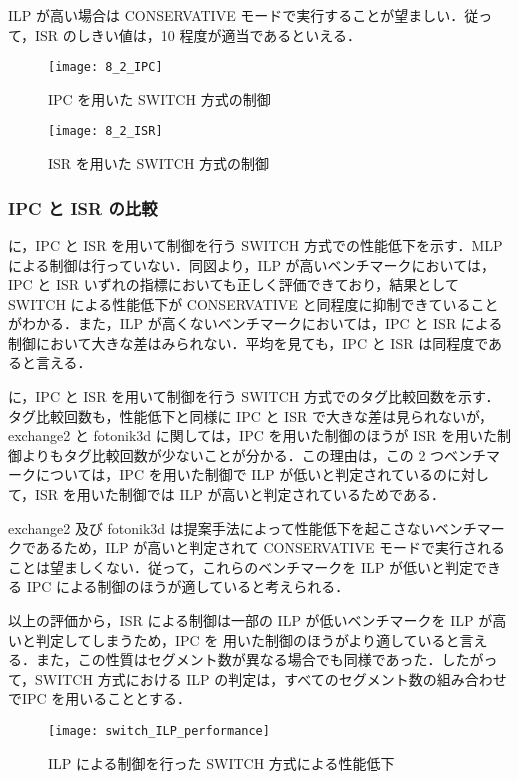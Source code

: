ILP が高い場合は CONSERVATIVE モードで実行することが望ましい．従って，ISR のしきい値は，10 程度が適当であるといえる．

\begin{figure}[htb]
  \centering
  \texttt{[image: 8\_2\_IPC]}
  \caption{IPC を用いた SWITCH 方式の制御}
  \label{fig:switch_IPC_rate}
\end{figure}

\begin{figure}[htb]
  \centering
  \texttt{[image: 8\_2\_ISR]}
  \caption{ISR を用いた SWITCH 方式の制御}
  \label{fig:switch_ISR_rate}
\end{figure}

\subsubsection{IPC と ISR の比較}
に，IPC と ISR を用いて制御を行う SWITCH 方式での性能低下を示す．MLP による制御は行っていない．同図より，ILP が高いベンチマークにおいては，IPC と ISR いずれの指標においても正しく評価できており，結果として SWITCH による性能低下が CONSERVATIVE と同程度に抑制できていることがわかる．また，ILP が高くないベンチマークにおいては，IPC と ISR による制御において大きな差はみられない．平均を見ても，IPC と ISR は同程度であると言える．

に，IPC と ISR を用いて制御を行う SWITCH 方式でのタグ比較回数を示す．タグ比較回数も，性能低下と同様に IPC と ISR で大きな差は見られないが，exchange2 と fotonik3d に関しては，IPC を用いた制御のほうが ISR を用いた制御よりもタグ比較回数が少ないことが分かる．この理由は，この 2 つベンチマークについては，IPC を用いた制御で ILP が低いと判定されているのに対して，ISR を用いた制御では ILP が高いと判定されているためである．

exchange2 及び fotonik3d は提案手法によって性能低下を起こさないベンチマークであるため，ILP が高いと判定されて CONSERVATIVE モードで実行されることは望ましくない．従って，これらのベンチマークを ILP が低いと判定できる IPC による制御のほうが適していると考えられる．


以上の評価から，ISR による制御は一部の ILP が低いベンチマークを ILP が高いと判定してしまうため，IPC を 用いた制御のほうがより適していると言える．また，この性質はセグメント数が異なる場合でも同様であった．したがって，SWITCH 方式における ILP の判定は，すべてのセグメント数の組み合わせでIPC を用いることとする．

\begin{figure}[htb]
  \centering
  \texttt{[image: switch\_ILP\_performance]}
  \caption{ILP による制御を行った SWITCH 方式による性能低下}
  \label{fig:switch_ILP_performance}
\end{figure}

